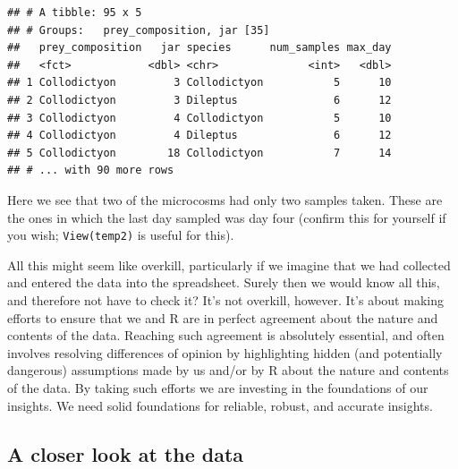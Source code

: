 \documentclass[]{book}
\makeatletter
\newenvironment{Shaded}{\begin{snugshade}}{\end{snugshade}}
\newcommand{\DataTypeTok}[1]{\textcolor[rgb]{0.13,0.29,0.53}{#1}}
\newcommand{\KeywordTok}[1]{\textcolor[rgb]{0.13,0.29,0.53}{\textbf{#1}}}
\newcommand{\NormalTok}[1]{#1}
\newcommand{\OperatorTok}[1]{\textcolor[rgb]{0.81,0.36,0.00}{\textbf{#1}}}
\newcommand{\StringTok}[1]{\textcolor[rgb]{0.31,0.60,0.02}{#1}}
\newenvironment{kframe}{%
\medskip{}
\setlength{\fboxsep}{.8em}
 \def\at@end@of@kframe{}%
 \ifinner\ifhmode%
  \def\at@end@of@kframe{\end{minipage}}%
  \begin{minipage}{\columnwidth}%
 \fi\fi%
 \def\FrameCommand##1{\hskip\@totalleftmargin \hskip-\fboxsep
 \colorbox{shadecolor}{##1}\hskip-\fboxsep
     \hskip-\linewidth \hskip-\@totalleftmargin \hskip\columnwidth}%
 \MakeFramed {\advance\hsize-\width
   \@totalleftmargin\z@ \linewidth\hsize
   \@setminipage}}%
 {\par\unskip\endMakeFramed%
 \at@end@of@kframe}
\newenvironment{rmdblock}[1]
  {
  \begin{itemize}
  \renewcommand{\labelitemi}{
    \raisebox{-.7\height}[0pt][0pt]{
      {\setkeys{Gin}{width=3em,keepaspectratio}\texttt{[image: images/\#1]}}
    }
  }
  \setlength{\fboxsep}{1em}
  \begin{kframe}
  \item
  }
  {
  \end{kframe}
  \end{itemize}
  }
\newenvironment{safety}
  {\begin{rmdblock}{safety}}
  {\end{rmdblock}}
\makeatother
\begin{document}
\begin{Shaded}
\end{Shaded}

\begin{verbatim}
## # A tibble: 95 x 5
## # Groups:   prey_composition, jar [35]
##   prey_composition   jar species      num_samples max_day
##   <fct>            <dbl> <chr>              <int>   <dbl>
## 1 Collodictyon         3 Collodictyon           5      10
## 2 Collodictyon         3 Dileptus               6      12
## 3 Collodictyon         4 Collodictyon           5      10
## 4 Collodictyon         4 Dileptus               6      12
## 5 Collodictyon        18 Collodictyon           7      14
## # ... with 90 more rows
\end{verbatim}

Here we see that two of the microcosms had only two samples taken. These are the ones in which the last day sampled was day four (confirm this for yourself if you wish; \texttt{View(temp2)} is useful for this).

\begin{safety}
All this might seem like overkill, particularly if we imagine that we
had collected and entered the data into the spreadsheet. Surely then we
would know all this, and therefore not have to check it? It's not
overkill, however. It's about making efforts to ensure that we and R are
in perfect agreement about the nature and contents of the data. Reaching
such agreement is absolutely essential, and often involves resolving
differences of opinion by highlighting hidden (and potentially
dangerous) assumptions made by us and/or by R about the nature and
contents of the data. By taking such efforts we are investing in the
foundations of our insights. We need solid foundations for reliable,
robust, and accurate insights.
\end{safety}

\hypertarget{a-closer-look-at-the-data}{%
\subsection{A closer look at the data}\label{a-closer-look-at-the-data}}
\end{document}
